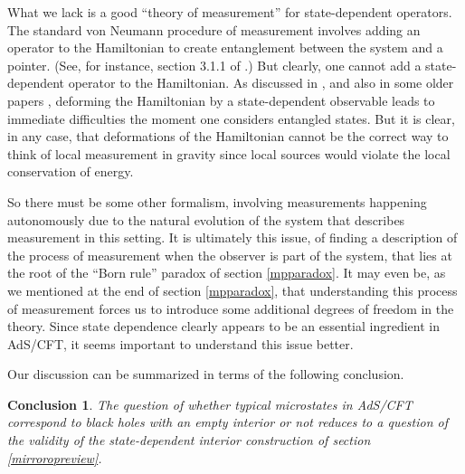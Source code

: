 \documentclass[12pt]{article}
\newtheorem{lesson}{Conclusion}
\begin{document}
What we lack is a good ``theory of measurement'' for state-dependent operators. The standard von Neumann procedure of measurement involves adding an operator to the Hamiltonian to create entanglement between the system and a pointer. (See, for instance, section 3.1.1 of  \cite{preskill1998lecture}.) But clearly, one cannot add a state-dependent operator to the Hamiltonian. As discussed in  \cite{Kapustin:2013yda}, and also in some older papers  \cite{gisin1990weinberg,PhysRevLett.66.397}, deforming the Hamiltonian by a state-dependent observable leads to immediate difficulties the moment one considers entangled states. But it is clear, in any case, that deformations of the Hamiltonian cannot be the correct way to think of local measurement in gravity since local sources would violate the local conservation of energy.

So there must be some other formalism, involving measurements happening autonomously due to the natural evolution of the system that describes measurement in this setting. It is ultimately this issue, of finding a description of the process of measurement when the observer is part of the system, that lies at the root of the ``Born rule'' paradox of section \ref{mpparadox}.  It may even be, as we mentioned at the end of section \ref{mpparadox}, that understanding this process of measurement forces us to introduce some additional degrees of freedom in the theory.  Since state dependence clearly appears to be an essential ingredient in AdS/CFT, it seems important to understand this issue better.




Our discussion can be summarized in terms of the following conclusion.
\begin{lesson}
\label{lessonlargebh}
The question of whether typical microstates in AdS/CFT correspond to black holes with an empty interior or not reduces to a question of the validity of the state-dependent interior construction of section \ref{mirroropreview}.
\end{lesson}
\end{document}
